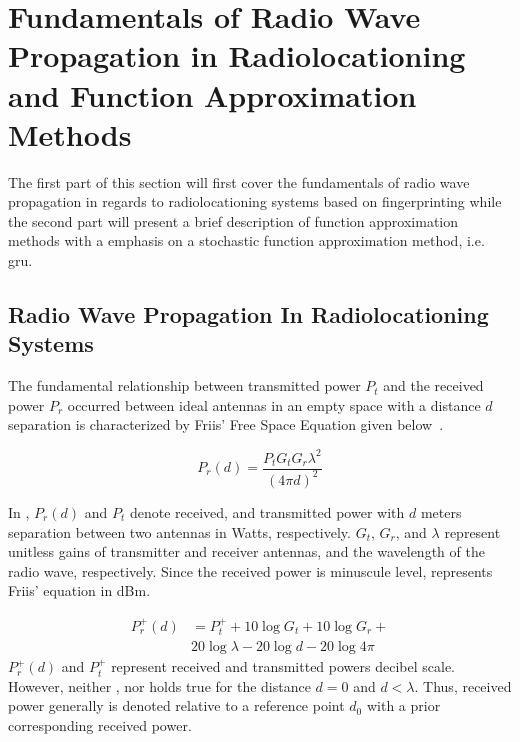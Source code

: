 \section{Fundamentals of Radio Wave Propagation in Radiolocationing and Function Approximation Methods}
    \label{sec:fundamentals}
    The first part of this section will first cover the fundamentals of radio wave propagation in regards to radiolocationing systems based on fingerprinting while the second part will present a brief description of function approximation methods with a emphasis on a stochastic function approximation method, i.e. \gls{gru}.

    \subsection{Radio Wave Propagation In Radiolocationing Systems}
        The fundamental relationship between transmitted power $P_t$ and the received power $P_r$ occurred between ideal antennas in an empty space with a distance $d$ separation is characterized by Friis' Free Space Equation given below~\cite{friis1946note}.

        \begin{equation}
            \label{eq:friisWatts}
                P_r(d) = \dfrac{P_t  G_t  G_r \lambda^2}{{\left(4 \pi d\right)}^2}
        \end{equation}

        In , $P_r(d)$ and $P_t$ denote received, and transmitted power with $d$ meters separation between two antennas in Watts, respectively.
        $G_t$, $G_r$, and $\lambda$ represent unitless gains of transmitter and receiver antennas, and the wavelength of the radio wave, respectively.
        Since the received power is minuscule level,  represents Friis' equation in dBm.

        \begin{equation}
          \begin{split}
            \label{eq:friisdBm}
            P^{+}_r(d) &= P^{+}_t + 10 \log{G_t} + 10 \log{G_r} + \\
            & 20 \log{\lambda} - 20 \log{d} - 20 \log{4 \pi}
          \end{split}
        \end{equation}
        $P^{+}_r(d)$ and $P^{+}_t$ represent received and transmitted powers decibel scale.
        However, neither , nor  holds true for the distance $d = 0$ and $d<\lambda$.
        Thus, received power generally is denoted relative to a reference point $d_0$ with a prior corresponding received power.

